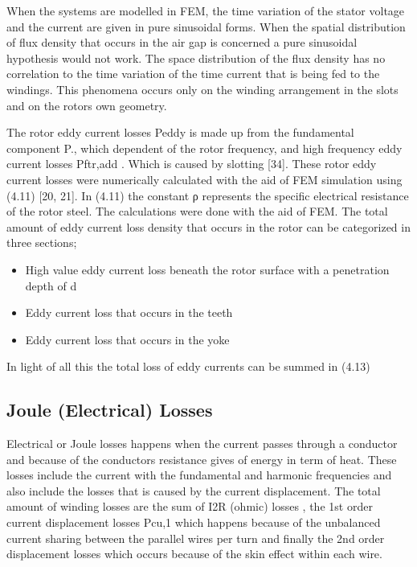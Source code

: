 When the systems are modelled in FEM, the time variation of the stator
voltage and the current are given in pure sinusoidal forms. When the spatial
distribution of flux density that occurs in the air gap is concerned a pure sinusoidal
hypothesis would not work. The space distribution of the flux density has no
correlation to the time variation of the time current that is being fed to the windings.
This phenomena occurs only on the winding arrangement in the slots and on the
rotors own geometry.

The rotor eddy current losses Peddy is made up from the fundamental
component P., which dependent of the rotor frequency, and high frequency eddy
current losses Pftr,add . Which is caused by slotting [34]. These rotor eddy current
losses were numerically calculated with the aid of FEM simulation using (4.11) [20,
21].
%
%
In (4.11) the constant ρ represents the specific electrical resistance of the rotor steel.
The calculations were done with the aid of FEM.
The total amount of eddy current loss density that occurs in the rotor can be
categorized in three sections;

\begin{itemize}
\item High value eddy current loss beneath the rotor surface with a penetration  depth of d
  \item Eddy current loss that occurs in the teeth
\item   Eddy current loss that occurs in the yoke
\end{itemize}

In light of all this the total loss of eddy currents can be summed in (4.13)

\subsection{Joule (Electrical) Losses} %

Electrical or Joule losses happens when the current passes through a
conductor and because of the conductors resistance gives of energy in term of heat.
These losses include the current with the fundamental and harmonic frequencies and
also include the losses that is caused by the current displacement. The total amount
of winding losses are the sum of I2R (ohmic) losses , the 1st order current
displacement losses Pcu,1 which happens because of the unbalanced current sharing
between the parallel wires per turn and finally the 2nd order displacement losses
which occurs because of the skin effect within each wire.

